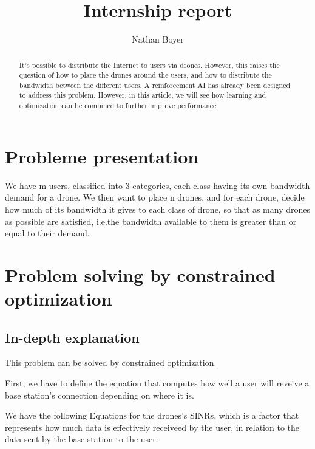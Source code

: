 \documentclass[letterpaper]{article}
\title{Internship report}
\author{Nathan Boyer}
\begin{document}
\maketitle


\begin{multicols}{2}
    


\begin{abstract}
    
    It's possible to distribute the Internet to users via drones.
    However, this raises the question of how to place the drones around the users, and how to distribute the bandwidth between the different users.
    A reinforcement AI has already been designed to address this problem.
    However, in this article, we will see how learning and optimization can be combined to further improve performance.

\end{abstract}


\section{Probleme presentation}

We have m users, classified into 3 categories, each class having its own bandwidth demand for a drone.
We then want to place n drones, and for each drone, decide how much of its bandwidth it gives to each class of drone, so that as many drones as possible are satisfied, i.e.\:the bandwidth available to them is greater than or equal to their demand.

\section{Problem solving by constrained optimization}

\subsection{In-depth explanation}

This problem can be solved by constrained optimization.

First, we have to define the equation that computes how well a user will reveive a base station's connection depending on where it is.

We have the following Equations for the drones's SINRs, which is a factor that represents how much data is effectively receiveed by the user, in relation to the data sent by the base station to the user:


\end{multicols}
\end{document}
